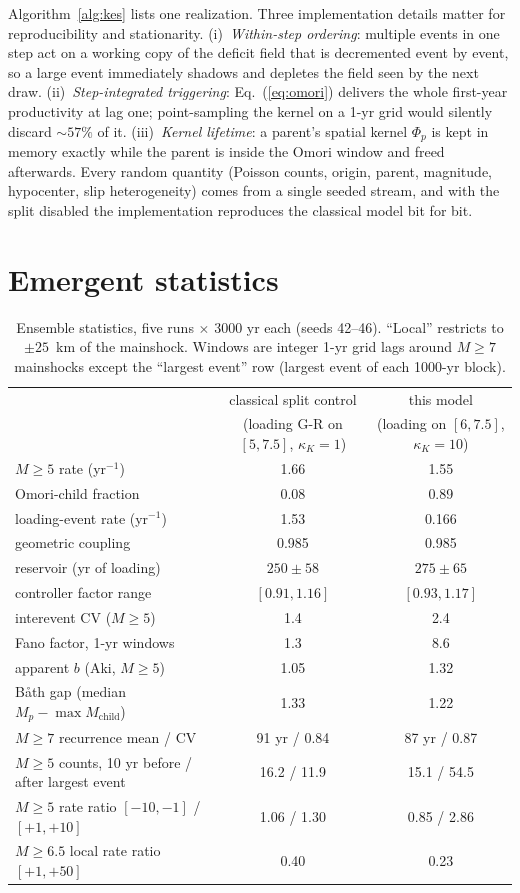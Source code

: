 \documentclass[11pt]{article}
\begin{document}
Algorithm~\ref{alg:kes} lists one realization. Three implementation details matter for
reproducibility and stationarity. (i)~\emph{Within-step ordering}: multiple events in
one step act on a working copy of the deficit field that is decremented event by event,
so a large event immediately shadows and depletes the field seen by the next draw.
(ii)~\emph{Step-integrated triggering}: Eq.~(\ref{eq:omori}) delivers the whole
first-year productivity at lag one; point-sampling the kernel on a 1-yr grid would
silently discard $\sim57\%$ of it. (iii)~\emph{Kernel lifetime}: a parent's spatial
kernel $\Phi_p$ is kept in memory exactly while the parent is inside the Omori window
and freed afterwards. Every random quantity (Poisson counts, origin, parent, magnitude,
hypocenter, slip heterogeneity) comes from a single seeded stream, and with the split
disabled the implementation reproduces the classical model bit for bit.

\section{Emergent statistics}
\label{sec:results}

\begin{table}[t]
\centering
\small
\begin{tabular}{lcc}
\toprule
 & classical split control & this model \\
 & (loading G-R on $[5,7.5]$, $\kappa_K{=}1$) & (loading on $[6,7.5]$, $\kappa_K{=}10$) \\
\midrule
$M\ge5$ rate (yr$^{-1}$) & 1.66 & 1.55 \\
Omori-child fraction & 0.08 & 0.89 \\
loading-event rate (yr$^{-1}$) & 1.53 & 0.166 \\
geometric coupling & 0.985 & 0.985 \\
reservoir (yr of loading) & $250 \pm 58$ & $275 \pm 65$ \\
controller factor range & $[0.91, 1.16]$ & $[0.93, 1.17]$ \\
interevent CV ($M\ge5$) & 1.4 & 2.4 \\
Fano factor, 1-yr windows & 1.3 & 8.6 \\
apparent $b$ (Aki, $M\ge5$) & 1.05 & 1.32 \\
B\aa th gap (median $M_p - \max M_{\mathrm{child}}$) & 1.33 & 1.22 \\
$M\ge7$ recurrence mean / CV & 91 yr / 0.84 & 87 yr / 0.87 \\
$M\ge5$ counts, 10 yr before / after largest event & 16.2 / 11.9 & 15.1 / 54.5 \\
$M\ge5$ rate ratio $[-10,-1]$ / $[+1,+10]$ & 1.06 / 1.30 & 0.85 / 2.86 \\
$M\ge6.5$ local rate ratio $[+1,+50]$ & 0.40 & 0.23 \\
\bottomrule
\end{tabular}
\caption{Ensemble statistics, five runs $\times$ 3000 yr each (seeds 42--46).
``Local'' restricts to $\pm25$~km of the mainshock. Windows are integer 1-yr grid lags
around $M\ge7$ mainshocks except the ``largest event'' row (largest event of each
1000-yr block).}
\label{tab:stats}
\end{table}
\end{document}
